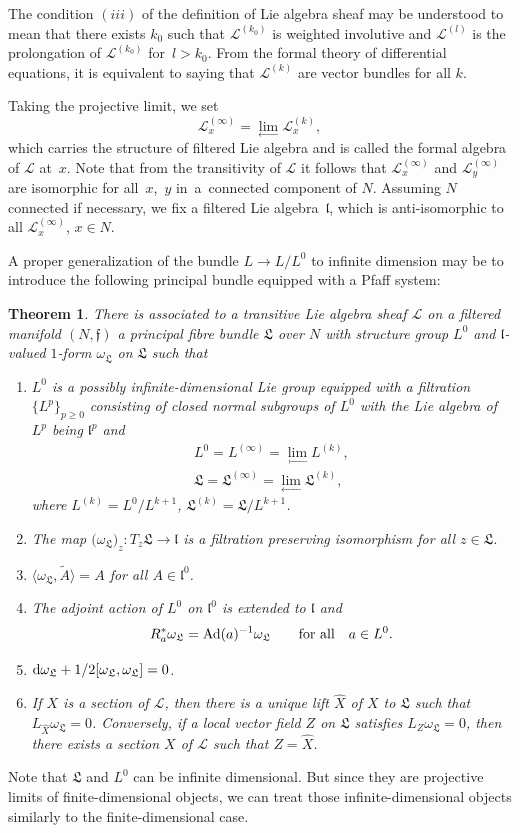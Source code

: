 \documentclass[pdftex]{sigma}%
\newcommand{\cL}{\mathcal L}
\newcommand{\fL}{\mathfrak L}
\newcommand{\f}{\mathfrak f}
\newcommand{\lf}{\mathfrak l}
\newcommand{\om}{\omega}
\newtheorem{thm}{Theorem}[section]
\numberwithin{equation}{section}
\begin{document}
The condition $(iii)$ of the definition of Lie algebra sheaf may be understood to mean that there exists $k_0$ such that $\cL^{(k_0)}$ is weighted involutive and $\cL^{(l)}$ is the prolongation of
$\cL^{(k_0)}$ for~$l>k_0$. From the formal theory of differential equations, it is equivalent
to saying that $\cL^{(k)}$ are vector bundles for all $k$.

Taking the projective limit, we set
\[
\cL^{(\infty)}_x = \lim_{\longleftarrow} \cL^{(k)}_x,
\]
which carries the structure of filtered Lie algebra and is called the formal algebra of $\cL$ at~$x$. Note that from the transitivity of $\cL$ it follows that $\cL^{(\infty)}_x$ and $\cL^{(\infty)}_y$ are isomorphic for all~$x$,~$y$ in~a~connected component of $N$. Assuming $N$ connected if necessary, we fix a filtered Lie algebra~$\lf$, which is anti-isomorphic to all $\cL^{(\infty)}_x$, $x\in N$.

A proper generalization of the bundle $L\to L/L^0$ to infinite dimension may be to introduce the following principal bundle equipped with a Pfaff system:

\begin{thm}\label{thm:n3}
There is associated to a transitive Lie algebra sheaf $\cL$ on a filtered manifold $(N,\f)$ a principal fibre bundle $\fL$ over $N$ with structure group $L^0$ and $\lf$-valued $1$-form $\om_{\fL}$ on $\fL$ such that
	\begin{enumerate}\itemsep=0pt
		\item[$(i)$] $L^0$ is a possibly infinite-dimensional Lie group equipped with a filtration $\{L^p\}_{p\ge 0}$ consisting of closed normal subgroups of $L^0$ with the Lie algebra of $L^p$ being $\lf^p$ and
		\begin{gather*}
		L^0 = L^{(\infty)} = \lim_{\longleftarrow} L^{(k)},\\
		\fL = \fL^{(\infty)} = \lim_{\longleftarrow} \fL^{(k)},
		\end{gather*}
		where $L^{(k)} = L^0/L^{k+1}$, $\fL^{(k)} = \fL/L^{k+1}$.
		\item[$(ii)$] The map $\big(\om_{\fL}\big)_z\colon T_z\fL\to\lf$ is a filtration preserving isomorphism for all $z\in \fL$.
		\item[$(iii)$] $\langle \om_{\fL}, \tilde A\rangle = A$ for all $A\in \lf^0$.
		\item[$(iv)$] The adjoint action of $L^0$ on $\lf^0$ is extended to $\lf$ and
		\[
		R^*_a\om_{\fL} = {\rm Ad}(a)^{-1}\om_{\fL} \qquad\text{for all}\quad a\in L^0.
		\]
		\item[$(v)$] ${\rm d}\om_{\fL} + 1/2 [\om_{\fL},\om_{\fL}] = 0$.
		\item[$(vi)$] If $X$ is a section of $\cL$, then there is a unique lift $\widehat X$ of $X$ to $\fL$ such that $L_{\widehat X}\om_{\fL} = 0$. Conversely, if a local vector field $Z$ on $\fL$ satisfies $L_Z\om_{\fL} = 0$, then there exists a section $X$ of $\cL$ such that $Z= \widehat X$.
	\end{enumerate}
\end{thm}
Note that $\fL$ and $L^0$ can be infinite dimensional. But since they are projective limits of finite-dimensional objects, we can treat those infinite-dimensional objects similarly to the finite-dimensional case.
\end{document}
